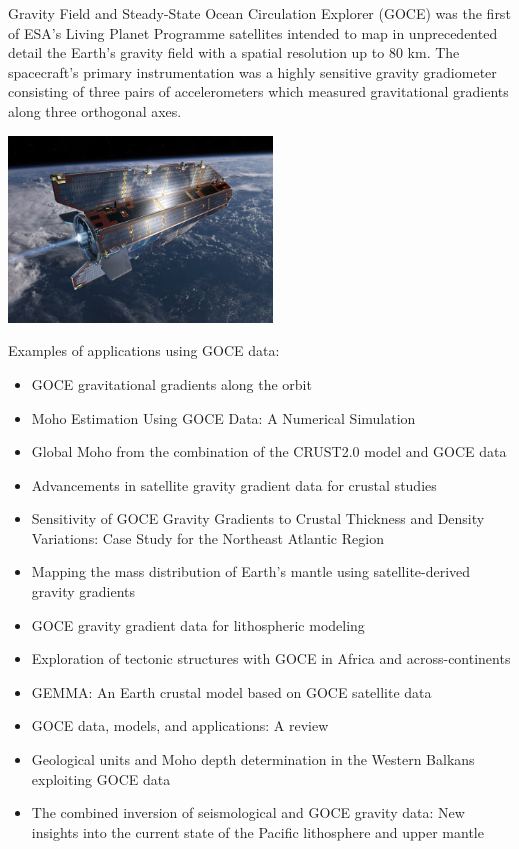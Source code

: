 Gravity Field and Steady-State Ocean Circulation Explorer (GOCE) was the first of ESA's 
Living Planet Programme satellites intended to map in unprecedented detail the Earth's gravity field
with a spatial resolution up to 80 km.
The spacecraft's primary instrumentation was a highly sensitive gravity gradiometer consisting of 
three pairs of accelerometers which measured gravitational gradients along three orthogonal axes.



\begin{center}
\includegraphics[width=7cm]{images/gravity/goce}
\end{center}

Examples of applications using GOCE data:
\begin{itemize}
\item GOCE gravitational gradients along the orbit \cite{boff11}
\item Moho Estimation Using GOCE Data: A Numerical Simulation \cite{resa12}
\item Global Moho from the combination of the CRUST2.0 model and GOCE data \cite{ress13}
\item Advancements in satellite gravity gradient data for crustal studies \cite{ebbf13}
\item Sensitivity of GOCE Gravity Gradients to Crustal Thickness and Density Variations: Case Study
for the Northeast Atlantic Region \cite{ebbf14}
\item Mapping the mass distribution of Earth’s mantle
using satellite-derived gravity gradients \cite{papg14}
\item GOCE gravity gradient data for lithospheric modeling \cite{boem15}
\item Exploration of tectonic structures with GOCE in Africa and across-continents \cite{brai15}
\item GEMMA: An Earth crustal model based on GOCE satellite data \cite{resa15}
\item GOCE data, models, and applications: A review \cite{vapb15a}
\item Geological units and Moho depth determination in the Western Balkans exploiting GOCE data \cite{samp15}
\item The combined inversion of seismological and GOCE gravity data: New
insights into the current state of the Pacific lithosphere and upper mantle \cite{togr17}
\end{itemize}

